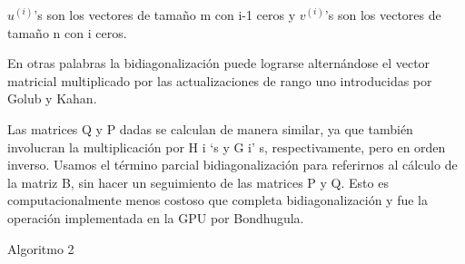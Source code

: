 \documentclass[]{article}
\begin{document}
\(u^(i)\)'s son los vectores de tamaño m con i-1 ceros y \(v^(i)\)'s son
los vectores de tamaño n con i ceros.

En otras palabras la bidiagonalización puede lograrse alternándose el
vector matricial multiplicado por las actualizaciones de rango uno
introducidas por Golub y Kahan.

Las matrices Q y P dadas se calculan de manera similar, ya que también
involucran la multiplicación por H i `s y G i' s, respectivamente, pero
en orden inverso. Usamos el término parcial bidiagonalización para
referirnos al cálculo de la matriz B, sin hacer un seguimiento de las
matrices P y Q. Esto es computacionalmente menos costoso que completa
bidiagonalización y fue la operación implementada en la GPU por
Bondhugula.

Algoritmo 2
\end{document}
